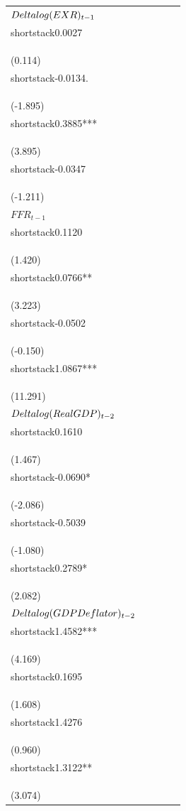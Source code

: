 \begin{table}[H]
\begin{tabular}{l c c c c}
$\\Delta\\log(EXR)_{t-1}$ & \\shortstack{0.0027\\\\(0.114)} & \\shortstack{-0.0134.\\\\(-1.895)} & \\shortstack{0.3885***\\\\(3.895)} & \\shortstack{-0.0347\\\\(-1.211)} \\
$FFR_{t-1}$ & \\shortstack{0.1120\\\\(1.420)} & \\shortstack{0.0766**\\\\(3.223)} & \\shortstack{-0.0502\\\\(-0.150)} & \\shortstack{1.0867***\\\\(11.291)} \\
$\\Delta\\log(Real\\ GDP)_{t-2}$ & \\shortstack{0.1610\\\\(1.467)} & \\shortstack{-0.0690*\\\\(-2.086)} & \\shortstack{-0.5039\\\\(-1.080)} & \\shortstack{0.2789*\\\\(2.082)} \\
$\\Delta\\log(GDP\\ Deflator)_{t-2}$ & \\shortstack{1.4582***\\\\(4.169)} & \\shortstack{0.1695\\\\(1.608)} & \\shortstack{1.4276\\\\(0.960)} & \\shortstack{1.3122**\\\\(3.074)} \\

\end{tabular}
\end{table}
